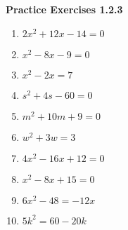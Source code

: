 \noindent\textbf{Practice Exercises 1.2.3}

\vspace{0.75ex}

\begin{multicols}{2}
\begin{enumerate}[label = \color{blue}\arabic*. ]
  \item $ 2x^2 + 12x - 14 = 0 $
  \item $ x^2 - 8x - 9 = 0 $
  \item $ x^2 - 2x = 7 $
  \item $ s^2 + 4s - 60 = 0 $
  \item $ m^2 + 10m + 9 = 0 $
  \item $ w^2 + 3w = 3 $
  \item $ 4x^2 -16x+ 12 = 0 $
  \item $ x^2 - 8x + 15 = 0 $
  \item $ 6x^2 - 48 = -12x $
  \item $ 5k^2 = 60 - 20k $
\end{enumerate}
\end{multicols}
				
				
